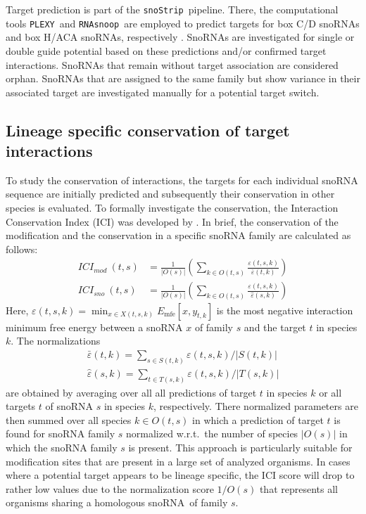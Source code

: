 \documentclass[preprint,3p,times,twocolumn]{elsarticle}
\newcommand{\sno}{snoRNA}
\newcommand{\cd}{box C/D snoRNA}
\newcommand{\haca}{box H/ACA snoRNA}
\newcommand{\snostrip}{\texttt{snoStrip}}
\newcommand{\plexy}{\texttt{PLEXY}}
\newcommand{\snoop}{\texttt{RNAsnoop}}
\begin{document}
Target prediction is part of the \snostrip\ pipeline. There, the
computational tools \plexy\ and \snoop\ are employed to predict
targets for \cd s and \haca s, respectively \cite{Kehr:2011,
  Tafer:2010}.  SnoRNAs are investigated for single or double guide
potential based on these predictions and/or confirmed target
interactions. SnoRNAs that remain without target association are
considered orphan. SnoRNAs that are assigned to the same family but
show variance in their associated target are investigated manually for
a potential target switch.

\subsection{Lineage specific conservation of target interactions}
To study the conservation of interactions, the targets for each
individual snoRNA sequence are initially predicted and subsequently
their conservation in other species is evaluated. To formally
investigate the conservation, the Interaction Conservation Index (ICI)
was developed by \cite{Kehr:2014}. In brief, the conservation of the
modification and the conservation in a specific snoRNA family are
calculated as follows:
\begin{equation}
  \begin{split}
    ICI_{mod}\:(t,s) & = \frac{1}{|O(s)|} \left( \sum_{k\in O(t,s)} \frac{\varepsilon(t,s,k)}{\bar\varepsilon(t,k)} \right) \\
    ICI_{sno}\:(t,s) & = \frac{1}{|O(s)|} \left( \sum_{k\in O(t,s)} \frac{\varepsilon(t,s,k)}{\hat\varepsilon(s,k)} \right)
  \end{split}
\end{equation}
Here, $ \varepsilon(t,s,k) = \min_{x\in X(t,s,k)}
E_{\textrm{mfe}}[x,y_{t,k}] $ is the most negative interaction minimum free
energy between a snoRNA $x$ of family $s$ and the target $t$ in species
$k$. The normalizations 
\begin{equation}
\begin{split}
\bar\varepsilon(t,k)=\sum_{s\in
  S(t,k)}\varepsilon(t,s,k)/|S(t,k)| \\
 \hat\varepsilon(s,k)=\sum_{t\in
  T(s,k)}\varepsilon(t,s,k)/|T(s,k)|
\end{split}
\end{equation}
are obtained by averaging over all all predictions of target $t$ in
species $k$ or all targets $t$ of snoRNA $s$ in species $k$,
respectively.  There normalized parameters are then summed over all
species $k\in O(t,s)$ in which a prediction of target $t$ is found for
snoRNA family $s$ normalized w.r.t.\ the number of species $|O(s)|$ in
which the snoRNA family $s$ is present. This approach is particularly
suitable for modification sites that are present in a large set of
analyzed organisms. In cases where a potential target appears to be
lineage specific, the ICI score will drop to rather low values due to
the normalization score $1/O(s)$ that represents all organisms sharing
a homologous \sno\ of family $s$.
\end{document}
